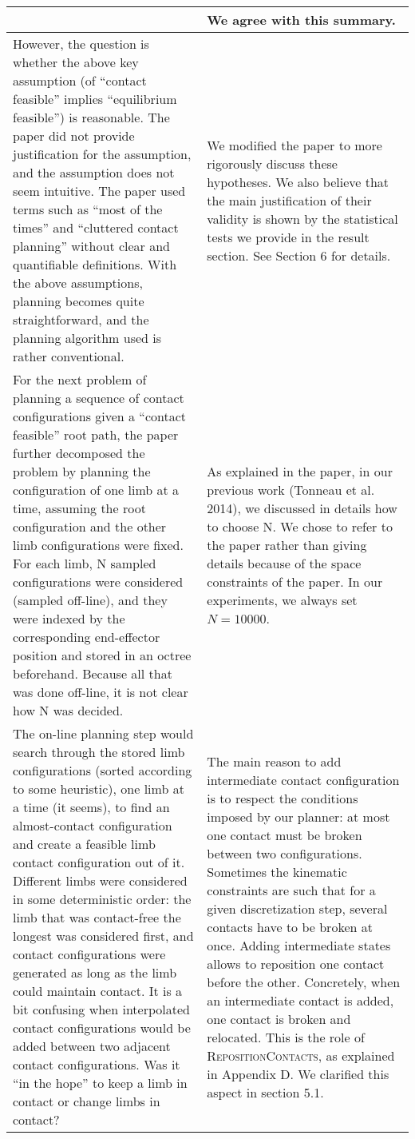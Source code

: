\documentclass[a4paper]{article}
\begin{document}
\begin{longtable}{|p{21em}|p{21em}|}
& We agree with this summary.
\\ \hline %
However, the question is whether the above key assumption (of 
“contact feasible” implies “equilibrium feasible”) is reasonable. The paper did not provide justification for the assumption, and the assumption does not seem intuitive. The paper used terms such as “most of the times” and “cluttered contact planning” without clear and quantifiable definitions. With the above assumptions, planning becomes quite straightforward, and the planning algorithm used is rather conventional. 
&
We modified the paper to more rigorously discuss these hypotheses. 
We also believe that the main justification of their validity is shown by the statistical tests we provide in the result section.\newline
See Section 6 for details. 
\\ \hline %
For the next problem of planning a sequence of contact configurations given a “contact feasible” root path, the paper further decomposed the problem by planning the configuration of one limb at a time, assuming the root configuration and the other limb configurations were fixed. For each limb, N sampled configurations were considered (sampled off-line), and they were indexed by the corresponding end-effector position and stored in an octree beforehand. 
Because all that was done off-line, it is not clear how N was decided. 
&
As explained in the paper, in our previous work (Tonneau et al. 2014), we discussed in details  how to choose N. We chose to refer to the paper rather than giving details  because of the space constraints of
the paper. In our experiments,
we always set $N=10000$.

\\ \hline %
The on-line planning step would search through the stored limb configurations (sorted according to some heuristic), one limb at a time (it seems), to find an almost-contact configuration and create a feasible limb contact configuration out of it. Different limbs were considered in some deterministic order: the limb that was contact-free the longest was considered first, and contact configurations were generated as long as the limb could maintain contact.  It is a bit confusing when interpolated contact configurations would be added between two adjacent contact configurations. Was it “in the hope” to keep a limb in contact or change limbs in contact? 
& 
The main reason to add intermediate contact configuration
is to respect the conditions imposed by our planner: at most one contact must be broken between two configurations. Sometimes the kinematic constraints are such
that for a given discretization step, several contacts have to be broken at once. Adding intermediate states allows to reposition one contact before the other.
Concretely, when an intermediate contact is added, one contact is broken and relocated. This is the role of \textsc{RepositionContacts}, as explained in Appendix D. We clarified this aspect in section 5.1.


\end{longtable}
\end{document}
